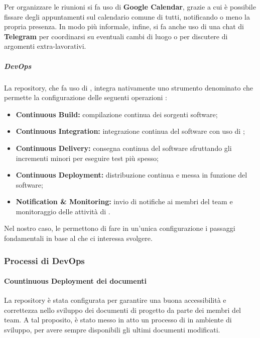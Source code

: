 		Per organizzare le riunioni si fa uso di \textbf{Google Calendar}, grazie a cui è possibile fissare degli appuntamenti sul calendario comune di tutti, notificando o meno la propria presenza.
		In modo più informale, infine, si fa anche uso di una chat di \textbf{Telegram} per coordinarsi su eventuali cambi di luogo o per discutere di argomenti extra-lavorativi.

		\subparagraph{DevOps}

		La repository, che fa uso di , integra nativamente uno strumento denominato  che permette la configurazione delle seguenti operazioni :
		\begin{itemize}
			\item \textbf{Continuous Build:} compilazione continua dei sorgenti software;
			\item \textbf{Continuous Integration:} integrazione continua del software con uso di ;
			\item \textbf{Continuous Delivery:} consegna continua del software sfruttando gli incrementi minori per eseguire test più spesso;
			\item \textbf{Continuous Deployment:} distribuzione continua e messa in funzione del software;
			\item \textbf{Notification \& Monitoring:} invio di notifiche ai membri del team e monitoraggio delle attività di .
		\end{itemize}

		Nel nostro caso, le  permettono di fare in un'unica configurazione i passaggi fondamentali in base al  che ci interessa svolgere. 



\subsubsection{Processi di DevOps} %

	\paragraph{Countinuous Deployment dei documenti}
	\label{sec:cd_docs}

	La repository è stata configurata per garantire una buona accessibilità e correttezza nello sviluppo dei documenti di progetto da parte dei membri del team. A tal proposito, è stato messo in atto un processo di  in ambiente di sviluppo, per avere sempre disponibili gli ultimi documenti modificati.

